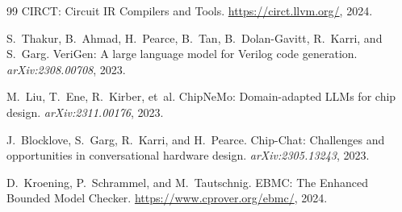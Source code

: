 \documentclass[11pt,twocolumn]{article}
\begin{document}
\begin{thebibliography}{99}
CIRCT: Circuit IR Compilers and Tools.
\url{https://circt.llvm.org/}, 2024.

S.~Thakur, B.~Ahmad, H.~Pearce, B.~Tan, B.~Dolan-Gavitt, R.~Karri, and S.~Garg.
VeriGen: A large language model for Verilog code generation.
\textit{arXiv:2308.00708}, 2023.

M.~Liu, T.~Ene, R.~Kirber, et~al.
ChipNeMo: Domain-adapted LLMs for chip design.
\textit{arXiv:2311.00176}, 2023.

J.~Blocklove, S.~Garg, R.~Karri, and H.~Pearce.
Chip-Chat: Challenges and opportunities in conversational hardware design.
\textit{arXiv:2305.13243}, 2023.

D.~Kroening, P.~Schrammel, and M.~Tautschnig.
EBMC: The Enhanced Bounded Model Checker.
\url{https://www.cprover.org/ebmc/}, 2024.

\end{thebibliography}
\end{document}
